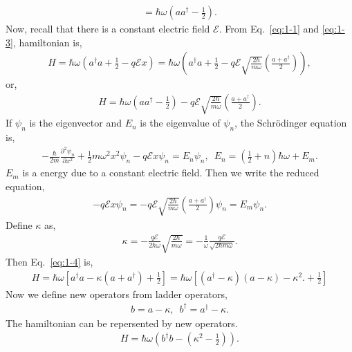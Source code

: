 \documentclass[floatfix,nofootinbib,superscriptaddress,fleqn]{revtex4-2}
\begin{document}
\begin{itemize}
\begin{align}
    = \hbar\omega\left(a a^\dagger - \frac{1}{2}\right).
  \end{align}
  Now, recall that there is a constant electric field $\mathcal{E}$. From Eq.~\eqref{eq:1-1}
   and \eqref{eq:1-3}, hamiltonian is,
   \begin{align}
    H = \hbar\omega\left(a^\dagger a + \frac{1}{2}-q\mathcal{E}x\right)
    = \hbar\omega\left(a^\dagger a + \frac{1}{2}-q\mathcal{E}
    \sqrt{\frac{2\hbar}{m\omega}}\left(\frac{a+a^\dagger}{2}\right)\right),
   \end{align}  
   or,
   \begin{align}\label{eq:1-4}
    H = \hbar\omega\left(a a^\dagger - \frac{1}{2}\right)
    -q\mathcal{E}\sqrt{\frac{2\hbar}{m\omega}}
    \left(\frac{a+a^\dagger}{2}\right).
   \end{align}
   If $\psi_n$ is the eigenvector and $E_n$ is the eigenvalue of $\psi_n$, 
   the Schr\"odinger equation is,
   \begin{align}
    -\frac{\hbar}{2m}\frac{\partial^2\psi_n}{\partial x^2}
    +\frac{1}{2}m\omega^2x^2\psi_n
    -q\mathcal{E}x\psi_n = E_n\psi_n,\,\,\, 
    E_n = \left(\frac{1}{2}+n\right)\hbar\omega+E_m.
   \end{align}
   $E_m$ is a energy due to a constant electric field. Then we write the 
   reduced equation,
   \begin{align}\label{eq:1-5}
    -q\mathcal{E}x\psi_n = -q\mathcal{E}\sqrt{\frac{2\hbar}{m\omega}}
    \left(\frac{a+a^\dagger}{2}\right)\psi_n = E_m\psi_n.
   \end{align}
   Define $\kappa$ as,
   \begin{align}
     \kappa = -\frac{q\mathcal{E}}{2\hbar\omega}\sqrt{\frac{2\hbar}{m\omega}}
     = -\frac{1}{\omega}\frac{q\mathcal{E}}{\sqrt{2\hbar m\omega}}.
   \end{align}
   Then Eq.~\eqref{eq:1-4} is,
   \begin{align}
     H = \hbar\omega\left[a^\dagger a-\kappa\left(a+a^\dagger\right)
     +\frac{1}{2}\right]
     = \hbar\omega\left[(a^\dagger - \kappa)(a - \kappa) -\kappa^2.
     +\frac{1}{2}\right]
   \end{align}
   Now we define new operators from ladder operators,
   \begin{align}
     b = a - \kappa,\,\,\,
     b^\dagger = a^\dagger - \kappa.
   \end{align}
   The hamiltonian can be repersented by new operators.
   \begin{align}
     H = \hbar\omega\left( b^\dagger b -\left(\kappa^2-\frac{1}{2}\right)\right).

\end{align}
\end{itemize}
\end{document}
